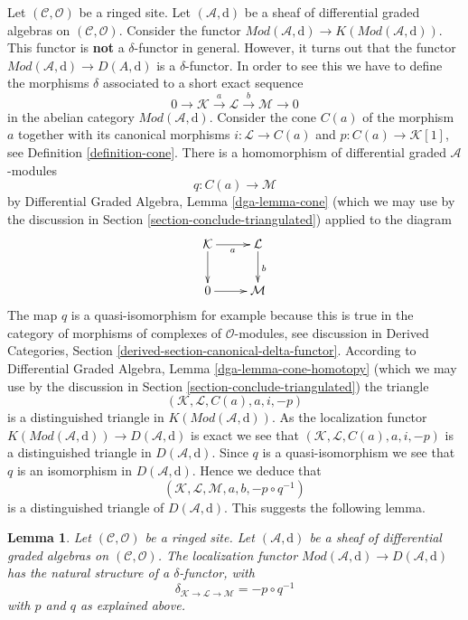 \documentclass{stacks-project}
\theoremstyle{plain}
\newtheorem{lemma}[subsection]{Lemma}
\theoremstyle{definition}
\theoremstyle{remark}
\numberwithin{equation}{subsection}
\begin{document}
\noindent
Let $(\mathcal{C}, \mathcal{O})$ be a ringed site. Let
$(\mathcal{A}, \text{d})$ be a sheaf of differential graded algebras
on $(\mathcal{C}, \mathcal{O})$.
Consider the functor
$\textit{Mod}(\mathcal{A}, \text{d}) \to
K(\textit{Mod}(\mathcal{A}, \text{d}))$.
This functor is {\bf not} a $\delta$-functor in general.
However, it turns out that the functor
$\textit{Mod}(\mathcal{A}, \text{d}) \to D(A, \text{d})$ is a
$\delta$-functor. In order to see this we have to define
the morphisms $\delta$ associated to a short exact sequence
$$
0 \to \mathcal{K} \xrightarrow{a} \mathcal{L} \xrightarrow{b} \mathcal{M} \to 0
$$
in the abelian category $\textit{Mod}(\mathcal{A}, \text{d})$.
Consider the cone $C(a)$ of the morphism $a$ together with its
canonical morphisms $i : \mathcal{L} \to C(a)$ and
$p : C(a) \to \mathcal{K}[1]$, see Definition \ref{definition-cone}.
There is a homomorphism of differential graded $\mathcal{A}$-modules
$$
q : C(a) \longrightarrow \mathcal{M}
$$
by Differential Graded Algebra, Lemma \ref{dga-lemma-cone}
(which we may use by the discussion in
Section \ref{section-conclude-triangulated})
applied to the diagram
$$
\xymatrix{
\mathcal{K} \ar[r]_a \ar[d] &
\mathcal{L} \ar[d]^b \\
0 \ar[r] &
\mathcal{M}
}
$$
The map $q$ is a quasi-isomorphism for example because this is true in
the category of morphisms of complexes of $\mathcal{O}$-modules, see
discussion in
Derived Categories, Section \ref{derived-section-canonical-delta-functor}.
According to Differential Graded Algebra, Lemma \ref{dga-lemma-cone-homotopy}
(which we may use by the discussion in
Section \ref{section-conclude-triangulated})
the triangle
$$
(\mathcal{K}, \mathcal{L}, C(a), a, i, -p)
$$
is a distinguished triangle in $K(\textit{Mod}(\mathcal{A}, \text{d}))$.
As the localization functor
$K(\textit{Mod}(\mathcal{A}, \text{d})) \to D(\mathcal{A}, \text{d})$ is
exact we see that $(\mathcal{K}, \mathcal{L}, C(a), a, i, -p)$
is a distinguished
triangle in $D(\mathcal{A}, \text{d})$. Since $q$ is a quasi-isomorphism
we see that $q$ is an isomorphism in $D(\mathcal{A}, \text{d})$.
Hence we deduce that
$$
(\mathcal{K}, \mathcal{L}, \mathcal{M}, a, b, -p \circ q^{-1})
$$
is a distinguished triangle of $D(\mathcal{A}, \text{d})$.
This suggests the following lemma.

\begin{lemma}
\label{lemma-derived-canonical-delta-functor}
Let $(\mathcal{C}, \mathcal{O})$ be a ringed site. Let
$(\mathcal{A}, \text{d})$ be a sheaf of differential graded algebras
on $(\mathcal{C}, \mathcal{O})$. The localization functor
$\textit{Mod}(\mathcal{A}, \text{d}) \to D(\mathcal{A}, \text{d})$
has the natural structure of a $\delta$-functor, with
$$
\delta_{\mathcal{K} \to \mathcal{L} \to \mathcal{M}} = - p \circ q^{-1}
$$
with $p$ and $q$ as explained above.
\end{lemma}
\end{document}
